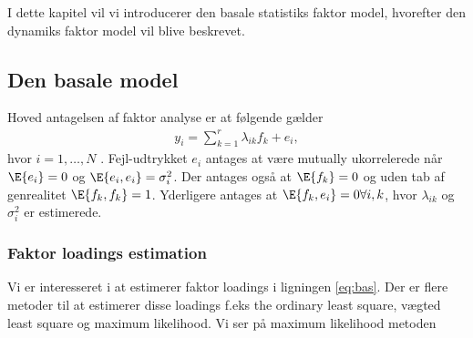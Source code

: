 I dette kapitel vil vi introducerer den basale statistiks faktor model, hvorefter den dynamiks faktor model vil blive beskrevet. 

\subsection{Den basale model}
Hoved antagelsen af faktor analyse er at følgende gælder
\begin{align}
y_i = \sum_{k=1}^r \lambda_{ik} f_k + e_i, \label{eq:bas}
\end{align}
hvor $i = 1, \dots, N$ . Fejl-udtrykket $e_i$ antages at være mutually ukorrelerede når $\E{e_i} = 0$ og $\E{e_i, e_i} = \sigma_i^2$. Der antages også at $\E{f_k} = 0$ og uden tab af genrealitet  $\E{f_k, f_k} = 1$. 
Yderligere antages at $\E{f_k, e_i} = 0 \forall i, k$, hvor $\lambda_{ik} $ og $\sigma_i^2$ er estimerede. 

\subsubsection{Faktor loadings estimation}
Vi er interesseret i at estimerer faktor loadings i ligningen \eqref{eq:bas}. Der er flere metoder til at estimerer disse loadings f.eks the ordinary least square, vægted least square og maximum likelihood.
Vi ser på maximum likelihood metoden  